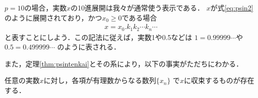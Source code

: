      $p=10$の場合，実数$x$の10進展開は我々が通常使う表示である．
     $x$が式\eqref{eq:psin2}のように展開されており，かつ$x_0 \geq 0$である場合
     \begin{align}
       x= x_0 . k_1 k_2 \cdots k_n \cdots 
       \label{eq:10sin}
     \end{align}
     と表すことにしよう．この記法に従えば，実数1や0.5などは
     $1 = 0.99999 \cdots $や$0.5 = 0.499999 \cdots$
     のように表される．

     また，定理\ref{thm:psintenkai}とその系により，以下の事実がただちにわかる．
     \begin{thm}
       任意の実数$x$に対し，各項が有理数からなる数列$\{ x_n \}$
       で$x$に収束するものが存在する．
     \end{thm}



%
%

